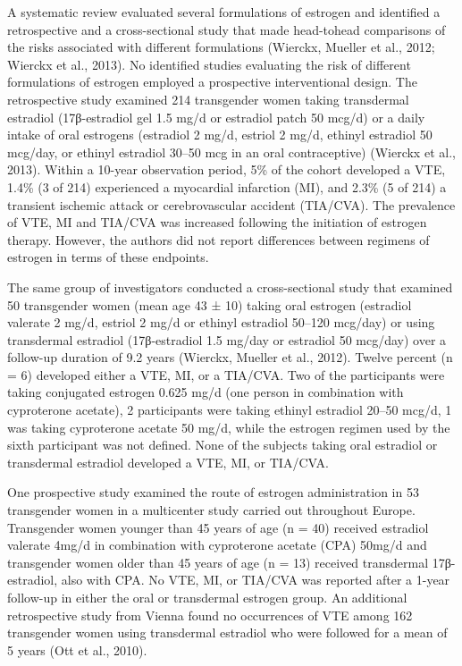 \documentclass[
]{book}
\begin{document}
A systematic review evaluated several formulations of estrogen and identified a retrospective
and a cross-sectional study that made head-tohead comparisons of the risks associated with
different formulations (Wierckx, Mueller et al.,
2012; Wierckx et al., 2013). No identified studies
evaluating the risk of different formulations of
estrogen employed a prospective interventional
design. The retrospective study examined 214
transgender women taking transdermal estradiol
(17β-estradiol gel 1.5 mg/d or estradiol patch
50 mcg/d) or a daily intake of oral estrogens
(estradiol 2 mg/d, estriol 2 mg/d, ethinyl estradiol
50 mcg/day, or ethinyl estradiol 30--50 mcg in an
oral contraceptive) (Wierckx et al., 2013). Within
a 10-year observation period, 5\% of the cohort
developed a VTE, 1.4\% (3 of 214) experienced
a myocardial infarction (MI), and 2.3\% (5 of 214)
a transient ischemic attack or cerebrovascular
accident (TIA/CVA). The prevalence of VTE, MI
and TIA/CVA was increased following the initiation of estrogen therapy. However, the authors
did not report differences between regimens of
estrogen in terms of these endpoints.

The same group of investigators conducted a
cross-sectional study that examined 50 transgender women (mean age 43 ± 10) taking oral estrogen (estradiol valerate 2 mg/d, estriol 2 mg/d or
ethinyl estradiol 50--120 mcg/day) or using transdermal estradiol (17β-estradiol 1.5 mg/day or
estradiol 50 mcg/day) over a follow-up duration
of 9.2 years (Wierckx, Mueller et al., 2012).
Twelve percent (n = 6) developed either a VTE,
MI, or a TIA/CVA. Two of the participants were
taking conjugated estrogen 0.625 mg/d (one person in combination with cyproterone acetate), 2
participants were taking ethinyl estradiol
20--50 mcg/d, 1 was taking cyproterone acetate
50 mg/d, while the estrogen regimen used by the
sixth participant was not defined. None of the
subjects taking oral estradiol or transdermal
estradiol developed a VTE, MI, or TIA/CVA.

One prospective study examined the route of
estrogen administration in 53 transgender women
in a multicenter study carried out throughout
Europe. Transgender women younger than 45
years of age (n = 40) received estradiol valerate
4mg/d in combination with cyproterone acetate
(CPA) 50mg/d and transgender women older than
45 years of age (n = 13) received transdermal
17β-estradiol, also with CPA. No VTE, MI, or
TIA/CVA was reported after a 1-year follow-up in
either the oral or transdermal estrogen group. An
additional retrospective study from Vienna found
no occurrences of VTE among 162 transgender
women using transdermal estradiol who were followed for a mean of 5 years (Ott et al., 2010).
\end{document}
